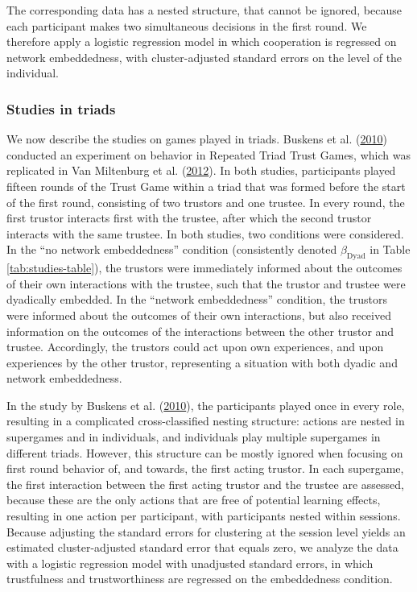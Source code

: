 \documentclass[
  11pt,
]{article}
\begin{document}
The corresponding data has a nested structure, that cannot be ignored, because each participant makes two simultaneous decisions in the first round.
We therefore apply a logistic regression model in which cooperation is regressed on network embeddedness, with cluster-adjusted standard errors on the level of the individual.

\hypertarget{studies-in-triads}{%
\subsubsection{Studies in triads}\label{studies-in-triads}}

We now describe the studies on games played in triads.
Buskens et al. (\protect\hyperlink{ref-buskens_raub_veer_triads_2010}{2010}) conducted an experiment on behavior in Repeated Triad Trust Games, which was replicated in Van Miltenburg et al. (\protect\hyperlink{ref-miltenburg_buskens_triads_2012}{2012}).
In both studies, participants played fifteen rounds of the Trust Game within a triad that was formed before the start of the first round, consisting of two trustors and one trustee.
In every round, the first trustor interacts first with the trustee, after which the second trustor interacts with the same trustee.
In both studies, two conditions were considered.
In the ``no network embeddedness'' condition (consistently denoted \(\beta_{\text{Dyad}}\) in Table \ref{tab:studies-table}), the trustors were immediately informed about the outcomes of their own interactions with the trustee, such that the trustor and trustee were dyadically embedded.
In the ``network embeddedness'' condition, the trustors were informed about the outcomes of their own interactions, but also received information on the outcomes of the interactions between the other trustor and trustee.
Accordingly, the trustors could act upon own experiences, and upon experiences by the other trustor, representing a situation with both dyadic and network embeddedness.

In the study by Buskens et al. (\protect\hyperlink{ref-buskens_raub_veer_triads_2010}{2010}), the participants played once in every role, resulting in a complicated cross-classified nesting structure: actions are nested in supergames and in individuals, and individuals play multiple supergames in different triads.
However, this structure can be mostly ignored when focusing on first round behavior of, and towards, the first acting trustor.
In each supergame, the first interaction between the first acting trustor and the trustee are assessed, because these are the only actions that are free of potential learning effects, resulting in one action per participant, with participants nested within sessions.
Because adjusting the standard errors for clustering at the session level yields an estimated cluster-adjusted standard error that equals zero, we analyze the data with a logistic regression model with unadjusted standard errors, in which trustfulness and trustworthiness are regressed on the embeddedness condition.
\end{document}

